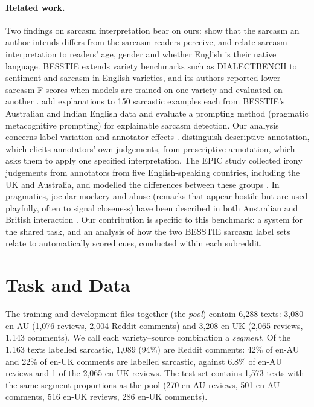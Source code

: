 \documentclass[11pt]{article}
\begin{document}
\paragraph{Related work.} Two findings on sarcasm interpretation bear on ours: \citet{oprea-magdy-2020-isarcasm} show that
the sarcasm an author intends differs from the sarcasm readers perceive, and \citet{oprea-magdy-2020-sociocultural} relate
sarcasm interpretation to readers' age, gender and whether English is their native language. BESSTIE extends
variety benchmarks such as DIALECTBENCH \citep{faisal-etal-2024-dialectbench} to sentiment and sarcasm in English
varieties, and its authors reported lower sarcasm F-scores when models are trained on one variety and evaluated on another
\citep{srirag-etal-2025-besstie}. \citet{singh2025nekminit} add explanations to 150 sarcastic examples each from BESSTIE's
Australian and Indian English data and evaluate a prompting method (pragmatic metacognitive prompting) for explainable sarcasm detection. Our analysis concerns label variation and
annotator effects \citep{geva-etal-2019-modeling,basile-etal-2021-need,plank-2022-problem}. \citet{rottger-etal-2022-two}
distinguish descriptive annotation, which elicits annotators' own judgements, from prescriptive annotation, which asks
them to apply one specified interpretation. The EPIC study collected irony judgements from annotators from five
English-speaking countries, including the UK and Australia, and modelled the differences between these groups
\citep{frenda-etal-2023-epic}. In pragmatics, jocular mockery and abuse (remarks that appear hostile but are used
playfully, often to signal closeness) have been described in both Australian and British interaction
\citep{haugh2012mock}. Our contribution is specific to this benchmark: a system for the shared task, and an analysis of
how the two BESSTIE sarcasm label sets relate to automatically scored cues, conducted within each subreddit.

\section{Task and Data}
\label{sec:data}
The training and development files together (the \emph{pool}) contain 6,288 texts: 3,080 en-AU (1,076 reviews, 2,004
Reddit comments) and 3,208 en-UK (2,065 reviews, 1,143 comments). We call each variety--source combination a
\emph{segment}. Of the 1,163 texts labelled sarcastic, 1,089 (94\%) are Reddit comments: 42\% of en-AU and 22\% of en-UK
comments are labelled sarcastic, against 6.8\% of en-AU reviews and 1 of the 2,065 en-UK reviews. The test set contains
1,573 texts with the same segment proportions as the pool (270 en-AU reviews, 501 en-AU comments, 516 en-UK reviews,
286 en-UK comments).
\end{document}

